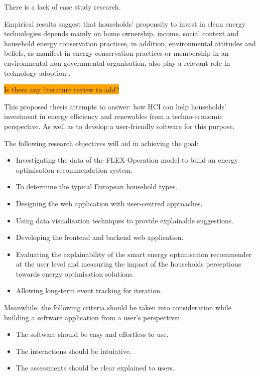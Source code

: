 There is a lack of case study research. 

Empirical results suggest that households' propensity to invest in clean energy technologies depends mainly on home ownership, income, social context and household energy conservation practices,
in addition, environmental attitudes and beliefs, as manifest in energy conservation practices or membership in an environmental non-governmental organisation, also play a relevant role in technology adoption \cite{determinants}.

\colorbox{orange}{Is there any literature review to add?}

This proposed thesis attempts to answer:  
how HCI can help households' investment in energy efficiency and renewables
from a techno-economic perspective.
As well as to develop a user-friendly software for this purpose. 

The following research objectives will aid in achieving the goal: 

\begin{itemize}
  \item Investigating the data of the FLEX-Operation model to build an energy optimisation recommendation system. 
  \item To determine the typical European household types. 
  \item Designing the web application with user-centred approaches. 
  \item Using data visualisation techniques to provide explainable suggestions. 
  \item Developing the frontend and backend web application. 
  \item Evaluating the explainability of the smart energy optimisation recommender at the user level and measuring the impact of the households perceptions towards energy optimisation solutions. 
  \item Allowing long-term event tracking for iteration. 
\end{itemize}

Meanwhile, the following criteria should be taken into consideration 
while building a software application from a user's perspective: 

\begin{itemize}
  \item The software should be easy and effortless to use. 
  \item The interactions should be intuiative. 
  \item The assessments should be clear explained to users. 
\end{itemize}

